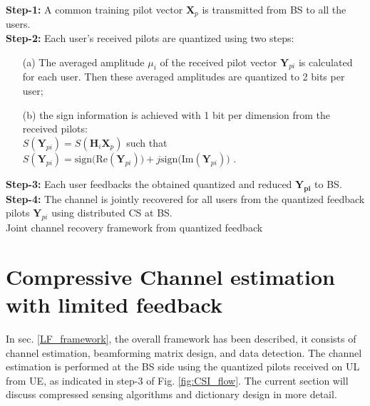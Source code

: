 \begin{algorithm}[H]
\SetAlgoLined
 \textbf{Step-1:} A common training pilot vector $\mathbf{X}_p$ is transmitted from BS to all the users.\\ 
 \textbf{Step-2:} Each user's received pilots are quantized using two steps:
 \begin{enumerate}
     \item[(a)]  The averaged amplitude $\mu_i$ of the received  pilot vector $\mathbf{Y}_{pi}$ is calculated for each user. Then these averaged amplitudes are quantized to 2 bits per user;
     \item[(b)] the sign information is achieved with 1 bit per dimension from the received pilots:\\ $S(\mathbf{Y}_{pi})=S(\mathbf{H}_i\mathbf{X}_{p}) $ such that\\ $S(\mathbf{Y}_{pi})=\text{sign(Re}(\mathbf{Y}_{pi}))+j\text{sign(Im}(\mathbf{Y}_{pi}))$ .
 \end{enumerate}
 \textbf{Step-3:} Each user feedbacks the obtained quantized and reduced $\mathbf{Y_{pi}}$  to BS.\\
\textbf{Step-4:} The channel is jointly recovered for all users from the quantized feedback pilots $\mathbf{Y}_{pi}$ using distributed CS at BS.\\
\caption{Joint channel recovery framework from quantized feedback}
 \label{algo1}
\end{algorithm}
 
\section{Compressive Channel estimation with limited feedback}
\label{sec:dict_formation}
In sec. \ref{LF_framework}, the overall framework has been described, it consists of channel estimation, beamforming matrix design, and data detection. The channel estimation is performed at the BS side using the quantized pilots received on UL from UE, as indicated in step-3 of Fig. \ref{fig:CSI_flow}.  The current section will discuss compressed sensing algorithms and dictionary design in more detail. 

